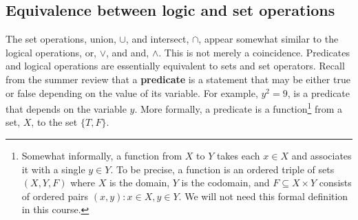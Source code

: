 \documentclass[12pt,reqno]{amsart}
\theoremstyle{definition}
\begin{document}
\subsection{Equivalence between logic and set
  operations \label{s:setLogic}} 
The set operations, union, $\cup$, and intersect, $\cap$, appear
somewhat similar to the logical operations, or, $\vee$, and and,
$\wedge$. This is not merely a coincidence. Predicates and logical
operations are essentially equivalent to sets and set
operators. Recall from the summer review that a \textbf{predicate} is
a statement that may be either true or false depending on the value of
its variable. For example, $y^2 = 9$, is a predicate that depends on
the variable $y$. More formally, a predicate is a
function\footnote{Somewhat informally, a function from $X$ to $Y$
  takes each $x \in X$ and associates it with a single $y \in Y$. To
  be precise, a function is an ordered triple of sets $(X,Y,F)$ where
  $X$ is the domain, $Y$ is the codomain, and $F \subseteq X \times Y$
  consists of ordered pairs $(x,y): x\in X, y \in Y$. We will not need
  this formal definition in this course. }
from a set, $X$, to the set $\{T, F \}$.  
\end{document}
